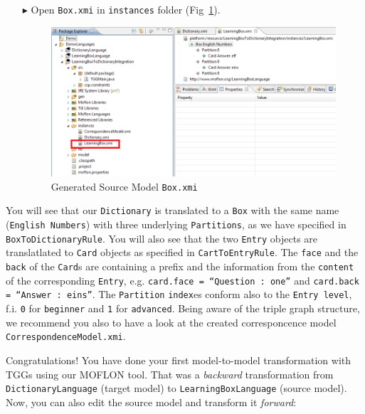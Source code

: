 \begin{enumerate}
\item[$\blacktriangleright$] Open \texttt{Box.xmi} in \texttt{instances} folder (Fig~\ref{fig:boxxmi}).

\begin{figure}[htbp]
\begin{center}
  \includegraphics[width=\textwidth]{pics/tggBilder/transformation/tgg27}
  \caption{Generated Source Model \texttt{Box.xmi}}  
  \label{fig:boxxmi}
\end{center}
\end{figure} 

\end{enumerate}

You will see that our \texttt{Dictionary} is translated to a \texttt{Box} with the same name (\texttt{English Numbers}) with three underlying \texttt{Par\-ti\-tions}, as we have specified in \texttt{Box\-To\-Dictionary\-Rule}.
You will also see that the two \texttt{Entry} objects are translatlated to \texttt{Card} objects as specified in \texttt{CartToEntryRule}.
The \texttt{face} and the \texttt{back} of the \texttt{Card}s are containing a prefix and the information from the \texttt{content} of the corresponding \texttt{Entry}, e.g. \texttt{card.face = ``Question : one''} and \texttt{card.back = ``Answer : eins''}. 
The \texttt{Partition} \texttt{index}es conform also to the \texttt{Entry level}, f.i. \texttt{0} for \texttt{beginner} and \texttt{1} for \texttt{advanced}.
Being aware of the triple graph structure, we recommend you also to have a look at the created corresponcence model \texttt{CorrespondenceModel.xmi}.  

Congratulations! You have done your first model-to-model transformation with TGGs using our MOFLON tool. 
That was a \emph{backward} transformation from \texttt{Dictionary\-Language} (target model) to \texttt{Learning\-Box\-Language} (source model). 
Now, you can also edit the source model and transform it \emph{forward}:

